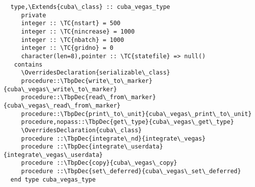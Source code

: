 \begin{Verbatim}
  type,\Extends{cuba\_class} :: cuba_vegas_type
     private
     integer :: \TC{nstart} = 500
     integer :: \TC{nincrease} = 1000
     integer :: \TC{nbatch} = 1000
     integer :: \TC{gridno} = 0
     character(len=8),pointer :: \TC{statefile} => null()
   contains
     \OverridesDeclaration{serializable\_class}
     procedure::\TbpDec{write\_to\_marker}{cuba\_vegas\_write\_to\_marker}
     procedure::\TbpDec{read\_from\_marker}{cuba\_vegas\_read\_from\_marker}
     procedure::\TbpDec{print\_to\_unit}{cuba\_vegas\_print\_to\_unit}
     procedure,nopass::\TbpDec{get\_type}{cuba\_vegas\_get\_type}
     \OverridesDeclaration{cuba\_class}
     procedure ::\TbpDec{integrate\_nd}{integrate\_vegas}
     procedure ::\TbpDec{integrate\_userdata}{integrate\_vegas\_userdata}
     procedure ::\TbpDec{copy}{cuba\_vegas\_copy}
     procedure ::\TbpDec{set\_deferred}{cuba\_vegas\_set\_deferred}
  end type cuba_vegas_type
\end{Verbatim}

